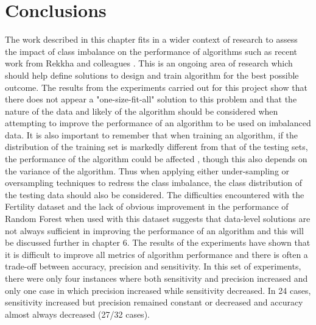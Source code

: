 \section{Conclusions}
The work described in this chapter fits in a wider context of research to assess the impact of class imbalance on the performance of algorithms such as recent work from Rekkha and colleagues \citep{Rekha:2019uu}. This is an ongoing area of research which should help define solutions to design and train algorithm for the best possible outcome.\newline
The results from the experiments carried out for this project show that there does not appear a "one-size-fit-all" solution to this problem and that the nature of the data and likely of the algorithm should be considered when attempting to improve the performance of an algorithm to be used on imbalanced data.\newline
It is also important to remember that when training an algorithm, if the distribution of the training set is markedly different from that of the testing sets, the performance of the algorithm could be affected \citep{Ling:2017jm}, though this also depends on the variance of the algorithm. Thus when applying either under-sampling or oversampling techniques to redress the class imbalance, the class distribution of the testing data should also be considered.\newline
The difficulties encountered with the Fertility dataset and the lack of obvious improvement in the performance of Random Forest when used with this dataset suggests that data-level solutions are not always sufficient in improving the performance of an algorithm and this will be discussed further in chapter 6.\newline
The results of the experiments have shown that it is difficult to improve all metrics of algorithm performance and there is often a trade-off between accuracy, precision and sensitivity. In this set of experiments, there were only four  instances where both sensitivity and precision increased and only one case in which precision increased while sensitivity decreased. In 24 cases, sensitivity increased but precision remained constant or decreased and accuracy almost always decreased (27/32 cases).\newline
